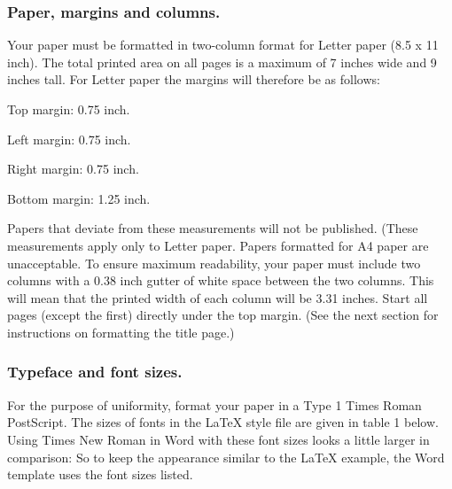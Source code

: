 \documentclass[letterpaper]{article}
\begin{document}
\subsubsection{Paper, margins and columns.} 	
Your paper must be formatted in two-column 
format for Letter paper (8.5 x 11 inch). The total printed area on all pages is 
a maximum of 7 inches wide and 9 inches tall. For Letter paper the margins 
will therefore be as follows:
\begin{itemize}
{\item Top margin: 0.75 inch.}
{\item Left margin: 0.75 inch.}
{\item Right margin: 0.75 inch.}
{\item Bottom margin: 1.25 inch.}
\end{itemize}
Papers that deviate from these measurements will not be published. 
(These measurements apply only to Letter paper. Papers formatted for A4 
paper are unacceptable.
To ensure maximum readability, your paper must include two columns 
with a 0.38 inch gutter of white space between the two columns. This 
will mean that the printed width of each column will be 3.31 inches. 
Start all pages (except the first) directly under the top margin. 
(See the next section for instructions on formatting the title page.) 

\subsubsection{Typeface and font sizes.}
For the purpose of uniformity, 
format your paper in a Type 1 Times Roman PostScript. 
The sizes of fonts in the LaTeX style file are given in table 1 below. 
Using Times New Roman in Word with these font sizes looks a little larger 
in comparison: So to keep the appearance similar to the LaTeX example, 
the Word template uses the font sizes listed. \\
\end{document}

